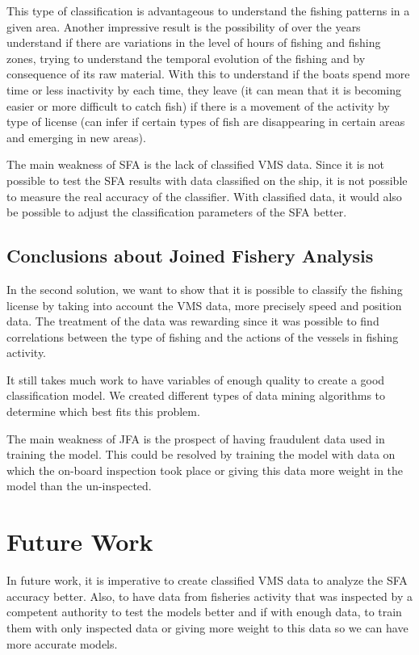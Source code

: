 This type of classification is advantageous to understand the fishing patterns in a given area. Another impressive result is the possibility of over the years understand if there are variations in the level of hours of fishing and fishing zones, trying to understand the temporal evolution of the fishing and by consequence of its raw material. With this to understand if the boats spend more time or less inactivity by each time, they leave (it can mean that it is becoming easier or more difficult to catch fish) if there is a movement of the activity by type of license (can infer if certain types of fish are disappearing in certain areas and emerging in new areas).


The main weakness of SFA is the lack of classified VMS data. Since it is not possible to test the SFA results with data classified on the ship, it is not possible to measure the real accuracy of the classifier. With classified data, it would also be possible to adjust the classification parameters of the SFA better.


\subsection{Conclusions about Joined Fishery Analysis} %
\label{sub:con_jfa}
In the second solution, we want to show that it is possible to classify the fishing license by taking into account the VMS data, more precisely speed and position data.
The treatment of the data was rewarding since it was possible to find correlations between the type of fishing and the actions of the vessels in fishing activity.

It still takes much work to have variables of enough quality to create a good classification model.
We created different types of data mining algorithms to determine which best fits this problem.

The main weakness of JFA is the prospect of having fraudulent data used in training the model. This could be resolved by training the model with data on which the on-board inspection took place or giving this data more weight in the model than the un-inspected.



\section{Future Work} %
\label{sub:future_work}

In future work, it is imperative to create classified VMS data to analyze the SFA accuracy better. Also, to have data from fisheries activity that was inspected by a competent authority to test the models better and if with enough data, to train them with only inspected data or giving more weight to this data so we can have more accurate models.
 







